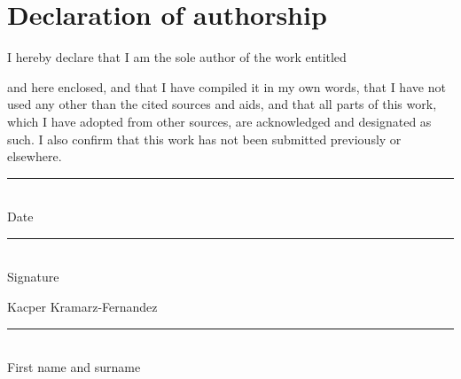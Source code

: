 \cleartorecto
\chapter*{Declaration of authorship}

\noindent
I hereby declare that I am the sole author of the work entitled

\begin{center}
  \emph{\thetitle}
\end{center}

\noindent
and here enclosed, and that I have compiled it in my own words, that I have not used any other
than the cited sources and aids, and that all parts of this work, which I have adopted from other
sources, are acknowledged and designated as such. I also confirm that this work has not been
submitted previously or elsewhere.

\vspace{3cm}

\noindent
\begin{minipage}[t]{0.42\linewidth}
  \rule{\linewidth}{0.4pt}\\
  Date
\end{minipage}
\hfill
\begin{minipage}[t]{0.42\linewidth}
  \rule{\linewidth}{0.4pt}\\
  Signature
\end{minipage}

\vspace{1.5cm}

\noindent
\begin{minipage}[t]{0.42\linewidth}
  Kacper Kramarz-Fernandez\\[-2pt]
  \rule{\linewidth}{0.4pt}\\
  First name and surname
\end{minipage}
